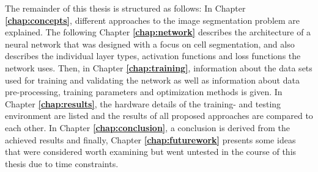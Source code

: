 \noindent The remainder of this thesis is structured as follows: In Chapter \textbf{\ref{chap:concepts}}, different approaches to the image segmentation problem are explained. The following Chapter \textbf{\ref{chap:network}} describes the architecture of a neural network that was designed with a focus on cell segmentation, and also describes the individual layer types, activation functions and loss functions the network uses. Then, in Chapter \textbf{\ref{chap:training}}, information about the data sets used for training and validating the network as well as information about data pre-processing, training parameters and optimization methods is given. In Chapter \textbf{\ref{chap:results}}, the hardware details of the training- and testing environment are listed and the results of all proposed approaches are compared to each other. In Chapter \textbf{\ref{chap:conclusion}}, a conclusion is derived from the achieved results and finally, Chapter \textbf{\ref{chap:futurework}} presents some ideas that were considered worth examining but went untested in the course of this thesis due to time constraints. 